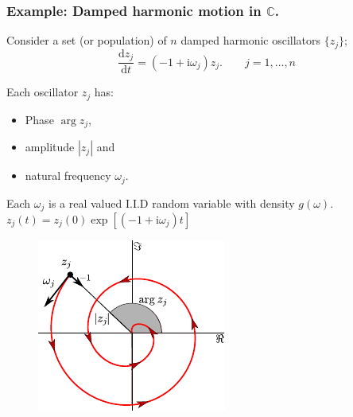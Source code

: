 \documentclass[10pt,reqno]{beamer}
\newcommand{\D}[2]{\frac{\mathrm{d} #1}{\mathrm{d} #2}}
\newcommand{\I}{\mathrm{i}}
\newcommand{\complex}{\mathbb{C}}
\begin{document}
\begin{frame}[t]
\frametitle{Example: Damped harmonic motion in $\complex$.} 
Consider a set (or population) of $n$ damped harmonic oscillators $\{z_j\}$;
\[
\D{z_j}{t} =(-1+\I\omega_j)z_j. \qquad j=1,\ldots,n
\] 
\begin{minipage}{0.49\textwidth}

\vspace{0.5cm}
Each oscillator $z_j$ has:
\begin{itemize}
	\item Phase $\arg{z_j}$,
	\item amplitude $|z_j|$ and 
	\item natural frequency $\omega_j$.
\end{itemize}

Each $\omega_j$ is a real valued I.I.D random variable with density $g(\omega)$.\\

$z_j(t) = z_j(0)\exp[(-1+\I\omega_j)t]$
\end{minipage}
\begin{minipage}{0.49\textwidth}
\begin{figure}
	\includegraphics{dosc}
\end{figure}
\centering

\end{minipage}
\end{frame}
\end{document}
